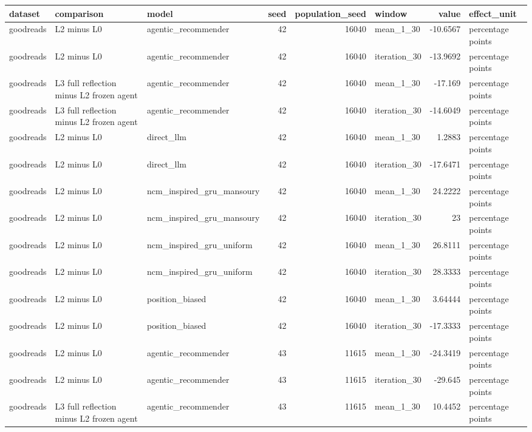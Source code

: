 \begin{table}[htbp!]
\centering
\small
\setlength{\tabcolsep}{3pt}
\renewcommand{\arraystretch}{1.1}
\begin{tabular}{lllrrlrl}
\hline
dataset & comparison & model & seed & population\_seed & window & value & effect\_unit \\
\hline
goodreads & L2 minus L0 & agentic\_recommender & 42 & 16040 & mean\_1\_30 & -10.6567 & percentage points \\
goodreads & L2 minus L0 & agentic\_recommender & 42 & 16040 & iteration\_30 & -13.9692 & percentage points \\
goodreads & L3 full reflection minus L2 frozen agent & agentic\_recommender & 42 & 16040 & mean\_1\_30 & -17.169 & percentage points \\
goodreads & L3 full reflection minus L2 frozen agent & agentic\_recommender & 42 & 16040 & iteration\_30 & -14.6049 & percentage points \\
goodreads & L2 minus L0 & direct\_llm & 42 & 16040 & mean\_1\_30 & 1.2883 & percentage points \\
goodreads & L2 minus L0 & direct\_llm & 42 & 16040 & iteration\_30 & -17.6471 & percentage points \\
goodreads & L2 minus L0 & ncm\_inspired\_gru\_mansoury & 42 & 16040 & mean\_1\_30 & 24.2222 & percentage points \\
goodreads & L2 minus L0 & ncm\_inspired\_gru\_mansoury & 42 & 16040 & iteration\_30 & 23 & percentage points \\
goodreads & L2 minus L0 & ncm\_inspired\_gru\_uniform & 42 & 16040 & mean\_1\_30 & 26.8111 & percentage points \\
goodreads & L2 minus L0 & ncm\_inspired\_gru\_uniform & 42 & 16040 & iteration\_30 & 28.3333 & percentage points \\
goodreads & L2 minus L0 & position\_biased & 42 & 16040 & mean\_1\_30 & 3.64444 & percentage points \\
goodreads & L2 minus L0 & position\_biased & 42 & 16040 & iteration\_30 & -17.3333 & percentage points \\
goodreads & L2 minus L0 & agentic\_recommender & 43 & 11615 & mean\_1\_30 & -24.3419 & percentage points \\
goodreads & L2 minus L0 & agentic\_recommender & 43 & 11615 & iteration\_30 & -29.645 & percentage points \\
goodreads & L3 full reflection minus L2 frozen agent & agentic\_recommender & 43 & 11615 & mean\_1\_30 & 10.4452 & percentage points \\

\end{tabular}
\end{table}
